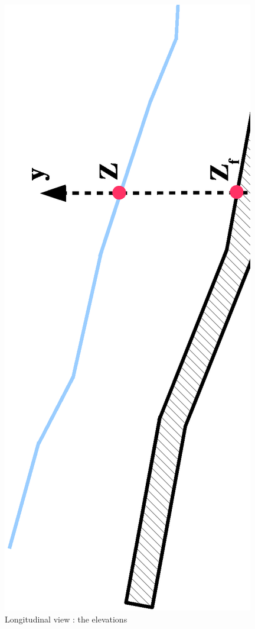 \begin{figure}
 \begin{center}
  \includegraphics[scale=0.5,angle=270]{Figures/VueLong2.eps} \hspace{2cm}
  \vspace{1.cm}
  \caption{Longitudinal view : the elevations}
 \end{center}
\end{figure}

